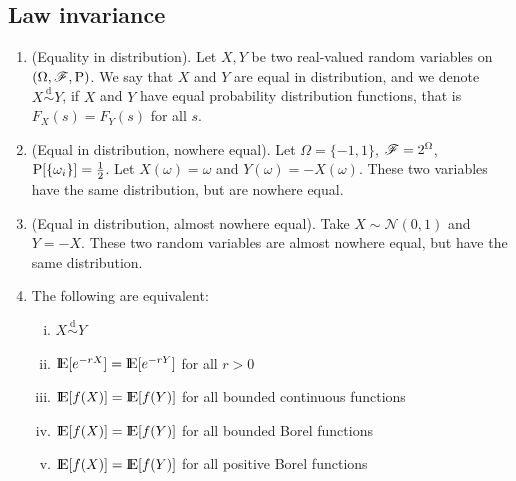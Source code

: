 \documentclass[a4paper,10pt]{scrbook}
\begin{document}
\subsection{Law invariance}
\begin{enumerate}
 \item (Equality in distribution). 
      Let $X,Y$ be two real-valued random variables on $(\Omega,\mathscr{F},\mathrm{P})$.
      We say that $X$ and $Y$ are equal in distribution, and we denote $X\overset{\mathrm{d}}{\sim} Y$,
      if $X$ and $Y$ have equal probability distribution functions, that is $F_X(s) = F_Y(s)$ for all $s$.

 \item (Equal in distribution, nowhere equal). Let $\Omega = \{-1,1\}$, $\mathscr{F}=2^\Omega$, $\mathrm{P}[\{\omega_i\}]=\frac{1}{2}$.
       Let $X(\omega) = \omega$ and $Y(\omega) = -X(\omega)$. These two variables have the same distribution, but 
       are nowhere equal.
 
 \item (Equal in distribution, almost nowhere equal). Take $X\sim \mathcal{N}(0,1)$ and $Y=-X$. These 
       two random variables are almost nowhere equal, but have the same distribution.
       
 \item The following are equivalent:
      \begin{enumerate}[i.]
       \item $X\overset{\mathrm{d}}{\sim} Y$
       \item $\E[e^{-rX}]=\E[e^{-rY}]$ for all $r>0$
       \item $\E[f(X)] = \E[f(Y)]$ for all bounded continuous functions
       \item $\E[f(X)] = \E[f(Y)]$ for all bounded Borel functions
       \item $\E[f(X)] = \E[f(Y)]$ for all positive Borel functions	
      \end{enumerate}

\end{enumerate}
\end{document}
